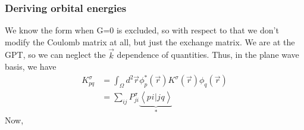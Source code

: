 \subsubsection{Deriving orbital energies}
We know the form when G=0 is excluded, so with respect to that we don't modify the Coulomb matrix at all, but just the exchange matrix.
We are at the GPT, so we can neglect the $\vec{k}$ dependence of quantities. Thus, in the plane wave basis, we have
\begin{align}
K_{ p q}^\sigma & =\int_{\Omega} d^2 \vec{r} \phi_{p}^*(\vec{r}) K^\sigma(\vec{r}) \phi_{q }(\vec{r}) \\
&=\sum_{ij} P_{ ji}^\sigma \underbrace{\left< p_{} i_{} | j_{} q_{} \right>}_{*} \label{K_exchange_final} 
\end{align}
Now,
